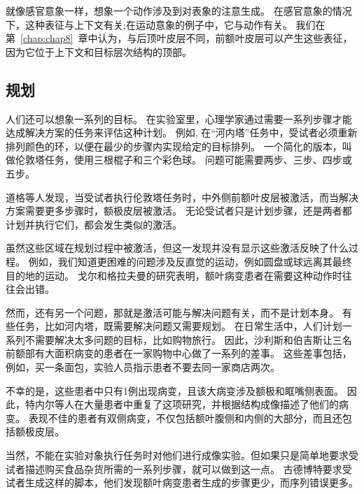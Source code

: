 就像感官意象一样，想象一个动作涉及到对表象的注意生成。
在感官意象的情况下，这种表征与上下文有关;在运动意象的例子中，它与动作有关。
我们在第~\ref{chap:chap8}~章中认为，与后顶叶皮层不同，前额叶皮层可以产生这些表征，因为它位于上下文和目标层次结构的顶部。
\par



\subsection{规划}

人们还可以想象一系列的目标。
在实验室里，心理学家通过需要一系列步骤才能达成解决方案的任务来评估这种计划。
例如, 在“河内塔”任务中，受试者必须重新排列颜色的环，以便在最少的步骤内实现给定的目标排列。
一个简化的版本，叫做伦敦塔任务，使用三根棍子和三个彩色球\cite{shallice1982specific}。
问题可能需要两步、三步、四步或五步。
\par


道格等人\cite{dagher1999mapping}发现，当受试者执行伦敦塔任务时，中外侧前额叶皮层被激活，而当解决方案需要更多步骤时，额极皮层被激活。
无论受试者只是计划步骤，还是两者都计划并执行它们，都会发生类似的激活\cite{rowe2001imaging,unterrainer2005influence}。
\par


虽然这些区域在规划过程中被激活，但这一发现并没有显示这些激活反映了什么过程。
例如，我们知道更困难的问题涉及反直觉的运动，例如圆盘或球远离其最终目的地的运动\cite{goel1995frontal}。
戈尔和格拉夫曼\cite{goel1995frontal}的研究表明，额叶病变患者在需要这种动作时往往会出错。
\par


然而，还有另一个问题，那就是激活可能与解决问题有关，而不是计划本身。
有些任务，比如河内塔，既需要解决问题又需要规划。
在日常生活中，人们计划一系列不需要解决太多问题的目标，比如购物旅行。
因此，沙利斯和伯吉斯\cite{shallice1982specific}让三名前额部有大面积病变的患者在一家购物中心做了一系列的差事。
这些差事包括，例如，买一条面包，实验人员指示患者不要去同一家商店两次。
\par


不幸的是，这些患者中只有1例出现病变，且该大病变涉及额极和眶嘴侧表面\cite{shallice2011organisation}。
因此，特内尔等人\cite{tranel2007impaired}在大量患者中重复了这项研究，并根据结构成像描述了他们的病变。
表现不佳的患者有双侧病变，不仅包括额叶腹侧和内侧的大部分，而且还包括额极皮层。
\par


当然，不能在实验对象执行任务时对他们进行成像实验。但如果只是简单地要求受试者描述购买食品杂货所需的一系列步骤，就可以做到这一点。
古德博特\cite{godbout1995mental}要求受试者生成这样的脚本，他们发现额叶病变患者生成的步骤更少，而序列错误更多。
\par


